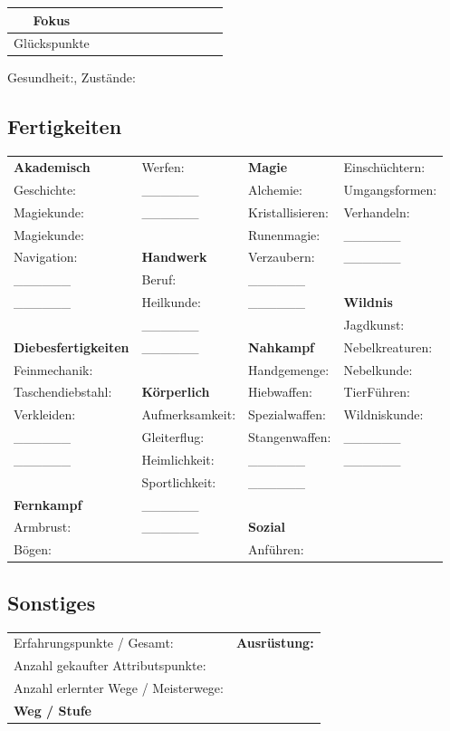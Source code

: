 \documentclass{article}
\begin{document}
\medskip
\newline\hline
\medskip
\begin{tabular}{| c | c | c | c | c | c | c | c | c | c | c |}
\hline
Fokus&&&&&&&&&&\\
\hline
Glückspunkte&&&&&&&&&&\\
\hline
\end{tabular}
\newline

Gesundheit:\space\space\space\space\space, Zustände:
\newline\hline
\begin{center}
\subsection{Fertigkeiten}
\end{center}
\begin{tabular}{ m{4cm}  m{4cm}  m{4cm}  m{4cm} }
\textbf{Akademisch}&Werfen:&\textbf{Magie}&Einschüchtern:\\
Geschichte:&\_\_\_\_\_\_&Alchemie:&Umgangsformen:\\
Magiekunde:&\_\_\_\_\_\_&Kristallisieren:&Verhandeln:\\
Magiekunde:&&Runenmagie:&\_\_\_\_\_\_\\
Navigation:&\textbf{Handwerk}&Verzaubern:&\_\_\_\_\_\_\\
\_\_\_\_\_\_&Beruf:&\_\_\_\_\_\_&\\
\_\_\_\_\_\_&Heilkunde:&\_\_\_\_\_\_&\textbf{Wildnis}\\
&\_\_\_\_\_\_&&Jagdkunst:\\
\textbf{Diebesfertigkeiten}&\_\_\_\_\_\_&\textbf{Nahkampf}&Nebelkreaturen:\\
Feinmechanik:&&Handgemenge:&Nebelkunde:\\
Taschendiebstahl:&\textbf{Körperlich}&Hiebwaffen:&TierFühren:\\
Verkleiden:&Aufmerksamkeit:&Spezialwaffen:&Wildniskunde:\\
\_\_\_\_\_\_&Gleiterflug:&Stangenwaffen:&\_\_\_\_\_\_\\
\_\_\_\_\_\_&Heimlichkeit:&\_\_\_\_\_\_&\_\_\_\_\_\_\\
&Sportlichkeit:&\_\_\_\_\_\_&\\
\textbf{Fernkampf}&\_\_\_\_\_\_&&\\
Armbrust:&\_\_\_\_\_\_&\textbf{Sozial}&\\
Bögen:&&Anführen:&\\
\end{tabular}

\newline\hline
\begin{center}
\subsection{Sonstiges}
\end{center}
\begin{tabular}{ m{10cm} m{10cm}}
Erfahrungspunkte / Gesamt:&\textbf{Ausrüstung:}\\
Anzahl gekaufter Attributspunkte:&\\
Anzahl erlernter Wege / Meisterwege:&\\
\textbf{Weg / Stufe}&\\
\end{tabular}
\end{document}
